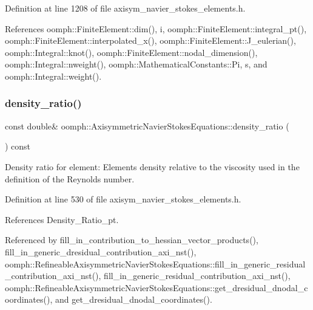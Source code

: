 Definition at line 1208 of file axisym\+\_\+navier\+\_\+stokes\+\_\+elements.\+h.



References oomph\+::\+Finite\+Element\+::dim(), i, oomph\+::\+Finite\+Element\+::integral\+\_\+pt(), oomph\+::\+Finite\+Element\+::interpolated\+\_\+x(), oomph\+::\+Finite\+Element\+::\+J\+\_\+eulerian(), oomph\+::\+Integral\+::knot(), oomph\+::\+Finite\+Element\+::nodal\+\_\+dimension(), oomph\+::\+Integral\+::nweight(), oomph\+::\+Mathematical\+Constants\+::\+Pi, s, and oomph\+::\+Integral\+::weight().

\mbox{\label{classoomph_1_1AxisymmetricNavierStokesEquations_a26df65fe19563b703fe274179e829900}} 
\subsubsection{\texorpdfstring{density\+\_\+ratio()}{density\_ratio()}}
{\footnotesize\ttfamily const double\& oomph\+::\+Axisymmetric\+Navier\+Stokes\+Equations\+::density\+\_\+ratio (\begin{DoxyParamCaption}{ }\end{DoxyParamCaption}) const\hspace{0.3cm}{\ttfamily [inline]}}



Density ratio for element\+: Element\textquotesingle{}s density relative to the viscosity used in the definition of the Reynolds number. 



Definition at line 530 of file axisym\+\_\+navier\+\_\+stokes\+\_\+elements.\+h.



References Density\+\_\+\+Ratio\+\_\+pt.



Referenced by fill\+\_\+in\+\_\+contribution\+\_\+to\+\_\+hessian\+\_\+vector\+\_\+products(), fill\+\_\+in\+\_\+generic\+\_\+dresidual\+\_\+contribution\+\_\+axi\+\_\+nst(), oomph\+::\+Refineable\+Axisymmetric\+Navier\+Stokes\+Equations\+::fill\+\_\+in\+\_\+generic\+\_\+residual\+\_\+contribution\+\_\+axi\+\_\+nst(), fill\+\_\+in\+\_\+generic\+\_\+residual\+\_\+contribution\+\_\+axi\+\_\+nst(), oomph\+::\+Refineable\+Axisymmetric\+Navier\+Stokes\+Equations\+::get\+\_\+dresidual\+\_\+dnodal\+\_\+coordinates(), and get\+\_\+dresidual\+\_\+dnodal\+\_\+coordinates().

